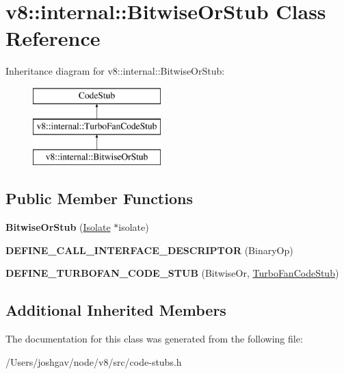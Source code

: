 \hypertarget{classv8_1_1internal_1_1_bitwise_or_stub}{}\section{v8\+:\+:internal\+:\+:Bitwise\+Or\+Stub Class Reference}
\label{classv8_1_1internal_1_1_bitwise_or_stub}
Inheritance diagram for v8\+:\+:internal\+:\+:Bitwise\+Or\+Stub\+:\begin{figure}[H]
\begin{center}
\leavevmode
\includegraphics[height=3.000000cm]{classv8_1_1internal_1_1_bitwise_or_stub}
\end{center}
\end{figure}
\subsection*{Public Member Functions}
\begin{DoxyCompactItemize}
\item 
{\bfseries Bitwise\+Or\+Stub} (\hyperlink{classv8_1_1internal_1_1_isolate}{Isolate} $\ast$isolate)\hypertarget{classv8_1_1internal_1_1_bitwise_or_stub_a0ca07b4054f46798afe4e4a1aa6b79b8}{}\label{classv8_1_1internal_1_1_bitwise_or_stub_a0ca07b4054f46798afe4e4a1aa6b79b8}

\item 
{\bfseries D\+E\+F\+I\+N\+E\+\_\+\+C\+A\+L\+L\+\_\+\+I\+N\+T\+E\+R\+F\+A\+C\+E\+\_\+\+D\+E\+S\+C\+R\+I\+P\+T\+OR} (Binary\+Op)\hypertarget{classv8_1_1internal_1_1_bitwise_or_stub_ac77d5988e39c59a2bf8ac1b99cb5808a}{}\label{classv8_1_1internal_1_1_bitwise_or_stub_ac77d5988e39c59a2bf8ac1b99cb5808a}

\item 
{\bfseries D\+E\+F\+I\+N\+E\+\_\+\+T\+U\+R\+B\+O\+F\+A\+N\+\_\+\+C\+O\+D\+E\+\_\+\+S\+T\+UB} (Bitwise\+Or, \hyperlink{classv8_1_1internal_1_1_turbo_fan_code_stub}{Turbo\+Fan\+Code\+Stub})\hypertarget{classv8_1_1internal_1_1_bitwise_or_stub_ac9994888537fb419ef9806419d988da5}{}\label{classv8_1_1internal_1_1_bitwise_or_stub_ac9994888537fb419ef9806419d988da5}

\end{DoxyCompactItemize}
\subsection*{Additional Inherited Members}


The documentation for this class was generated from the following file\+:\begin{DoxyCompactItemize}
\item 
/\+Users/joshgav/node/v8/src/code-\/stubs.\+h\end{DoxyCompactItemize}
